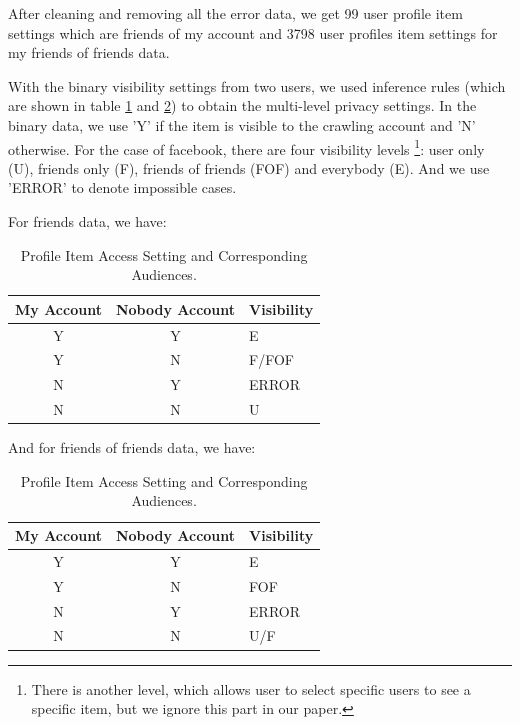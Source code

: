 \documentclass[a4paper]{article}
\begin{document}
After cleaning and removing all the error data, we get 99 user
profile item settings which are friends of my account and 3798 user
profiles item settings for my friends of friends data. 

With the binary visibility settings from two users, we used inference
rules (which are shown in table \ref{tbl:f_vis_setting} and
\ref{tbl:fof_vis_setting}) to obtain the multi-level privacy
settings. In the binary data, 
we use 'Y' if the item is visible to the crawling account and 'N'
otherwise. For the case of facebook, there are four visibility
levels \footnote{There is another level, which allows user to select
  specific users to see a specific item, but we ignore this part in
  our paper.}: user only (U), friends only (F), friends of friends
(FOF) and everybody (E). And we use 'ERROR' to denote impossible cases. 

For friends data, we have: \\
\begin{table}[h]
  \centering
  \begin{tabular}{c|c|l}
    \toprule 
    \textbf{My Account} & \textbf{Nobody Account} & Visibility \\ 
    \toprule
    Y & Y & E \\ \midrule 
    Y & N & F/FOF \\ \midrule 
    N & Y & ERROR \\ \midrule 
    N & N & U \\ \midrule 
  \end{tabular}
  \caption{Profile Item Access Setting and Corresponding Audiences.}
  \label{tbl:f_vis_setting}
\end{table}

And for friends of friends data, we have: \\ 
\begin{table}[h]
  \centering
  \begin{tabular}{|c|c|l|}
    \toprule 
    \textbf{My Account} & \textbf{Nobody Account} & Visibility \\ 
    \toprule
    Y & Y & E \\ \midrule 
    Y & N & FOF \\ \midrule 
    N & Y & ERROR \\ \midrule 
    N & N & U/F \\ \midrule 
  \end{tabular}
  \caption{Profile Item Access Setting and Corresponding Audiences.}
  \label{tbl:fof_vis_setting}
\end{table}
\end{document}
